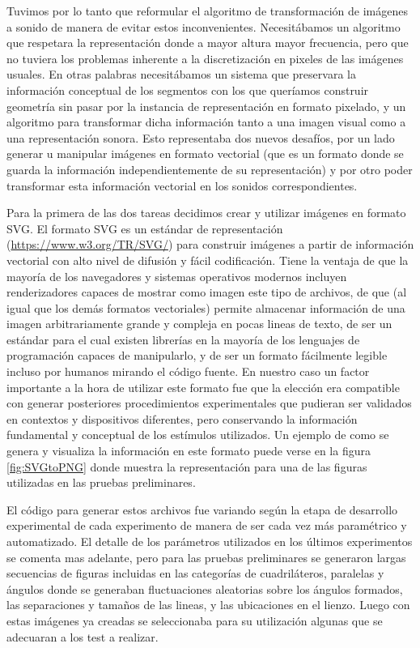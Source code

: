 \documentclass{article}
\begin{document}
    Tuvimos por lo tanto que reformular el algoritmo de transformación de imágenes a sonido de manera de evitar estos inconvenientes. Necesitábamos un algoritmo que respetara la representación donde a mayor altura mayor frecuencia, pero que no tuviera los problemas inherente a la discretización en pixeles de las imágenes usuales. En otras palabras necesitábamos un sistema que preservara la información conceptual de los segmentos con los que queríamos construir geometría sin pasar por la instancia de representación en formato pixelado, y un algoritmo para transformar dicha información tanto a una imagen visual como a una representación sonora. Esto representaba dos nuevos desafíos, por un lado generar u manipular imágenes en formato vectorial (que es un formato donde se guarda la información independientemente de su representación) y por otro poder transformar esta información vectorial en los sonidos correspondientes. 
    
    Para la primera de las dos tareas decidimos crear y utilizar imágenes en formato SVG. El formato SVG es un estándar de representación (\url{https://www.w3.org/TR/SVG/}) para construir imágenes a partir de información vectorial con alto nivel de difusión y fácil codificación. Tiene la ventaja de que la mayoría de los navegadores y sistemas operativos modernos incluyen renderizadores capaces de mostrar como imagen este tipo de archivos, de que (al igual que los demás formatos vectoriales) permite almacenar información de una imagen arbitrariamente grande y compleja en pocas lineas de texto, de ser un estándar para el cual existen librerías en la mayoría de los lenguajes de programación capaces de manipularlo, y de ser un formato fácilmente legible incluso por humanos mirando el código fuente. En nuestro caso un factor importante a la hora de utilizar este formato fue que la elección era compatible con generar posteriores procedimientos experimentales que pudieran ser validados en contextos y dispositivos diferentes, pero conservando la información fundamental y conceptual de los estímulos utilizados. Un ejemplo de como se genera y visualiza la información en este formato puede verse en la figura \ref{fig:SVGtoPNG} donde muestra la representación para una de las figuras utilizadas en las pruebas preliminares. 
    
    El código para generar estos archivos fue variando según la etapa de desarrollo experimental de cada experimento de manera de ser cada vez más paramétrico y automatizado. El detalle de los parámetros utilizados en los últimos experimentos se comenta mas adelante, pero para las pruebas preliminares se generaron largas secuencias de figuras incluidas en las categorías de cuadriláteros, paralelas y ángulos donde se generaban fluctuaciones aleatorias sobre los ángulos formados, las separaciones y tamaños de las lineas, y las ubicaciones en el lienzo. Luego con estas imágenes ya creadas se seleccionaba para su utilización algunas que se adecuaran a los test a realizar.
    
\end{document}
